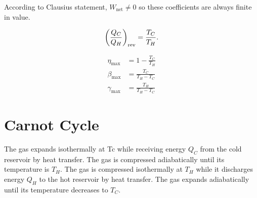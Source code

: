 \documentclass{report}
\begin{document}
According to Clausius statement, $W_\text{net} \neq 0$ so these coefficients are always finite in value.

\[
	\left(\frac{Q_C}{Q_H}\right)_\text{rev} = \frac{T_C}{T_H}
	.\]

\begin{align*}
	\eta_\text{max}   & = 1 - \frac{T_C}{T_H}   \\
	\beta_\text{max}  & = \frac{T_C}{T_H - T_C} \\
	\gamma_\text{max} & = \frac{T_H}{T_H - T_C}
\end{align*}

\section{Carnot Cycle}

\begin{description}
	\ii[Process 1—2] The gas expands isothermally at Tc while receiving energy $Q_C$ from the cold reservoir by heat transfer.
	\ii[Process 2—3] The gas is compressed adiabatically until its temperature is $T_H$.
	\ii[Process 3—4] The gas is compressed isothermally at $T_H$ while it discharges energy $Q_H$ to the hot reservoir by heat transfer.
	\ii[Process 4—1] The gas expands adiabatically until its temperature decreases to $T_C$.
\end{description}

%
%
%
%
\end{document}
